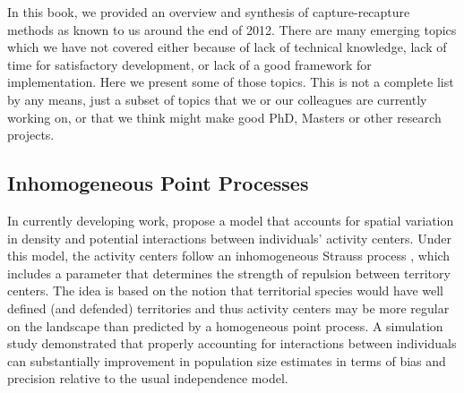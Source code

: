 In this book, we provided an overview and synthesis of
capture-recapture methods as known to us around the end of 2012. There
are many emerging topics which we have not covered either because of
lack of technical knowledge, lack of time for satisfactory
development, or lack of a good framework for implementation. Here we
present some of those topics. This is not a complete list by any means,
just a subset of topics that we or our colleagues are currently working on, or that we think
might make good PhD, Masters or other research projects.


\subsection{Inhomogeneous Point Processes}
\label{last.sec.ipp}

In currently developing work, \citet{reich_etal:2012} propose a model
that accounts for spatial variation in %
density and
potential interactions between individuals' activity centers.
Under this model,
the activity centers follow an inhomogeneous Strauss process
\citep{strauss:1975}, which %
includes a parameter that determines the strength
of repulsion between territory centers. %
The idea is based on the notion
that territorial species would have well defined (and defended)
territories
and thus activity centers may be more regular on the landscape
than predicted by a homogeneous point process.
A simulation study demonstrated %
that properly accounting for
interactions between individuals can %
substantially improvement
in %
population size estimates in terms of bias and precision relative to
the usual independence model. %

